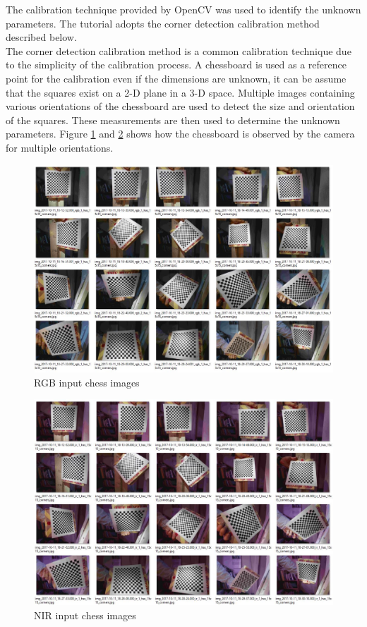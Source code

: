 The calibration technique provided by OpenCV was used to identify the unknown parameters. The tutorial adopts the corner detection calibration method described below.\\

The corner detection calibration method is a common calibration technique due to the simplicity of the calibration process.  A chessboard is used as a reference point for the calibration even if the dimensions are unknown, it can be assume that the squares exist on a 2-D plane in a 3-D space. Multiple images containing various orientations of the chessboard are used to detect the size and orientation of the squares. These measurements are then used to determine the unknown parameters. Figure \ref{fig:rgb_input_chess} and \ref{fig:ir_input_chess} shows how the chessboard is observed by the camera for multiple orientations. 

\begin{figure}[H]
\centering
\includegraphics[scale=0.505]{images/rgb_chess_set.JPG}
\caption{RGB input chess images}
\label{fig:rgb_input_chess}
\end{figure}

\begin{figure}[H]
\centering
\includegraphics[scale=0.5]{images/ir_chess_set.JPG}
\caption{NIR input chess images}
\label{fig:ir_input_chess}
\end{figure}


